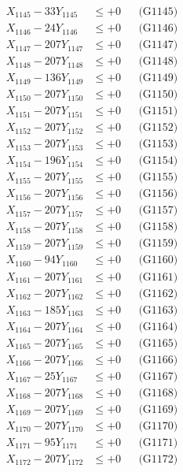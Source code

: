\documentclass[a4paper,10pt]{article}
\begin{document}
{\begin{align}
X_{1145} - 33Y_{1145} &\leq +0 && \text{(G1145)} \\
X_{1146} - 24Y_{1146} &\leq +0 && \text{(G1146)} \\
X_{1147} - 207Y_{1147} &\leq +0 && \text{(G1147)} \\
X_{1148} - 207Y_{1148} &\leq +0 && \text{(G1148)} \\
X_{1149} - 136Y_{1149} &\leq +0 && \text{(G1149)} \\
X_{1150} - 207Y_{1150} &\leq +0 && \text{(G1150)} \\
\allowbreak
X_{1151} - 207Y_{1151} &\leq +0 && \text{(G1151)} \\
X_{1152} - 207Y_{1152} &\leq +0 && \text{(G1152)} \\
X_{1153} - 207Y_{1153} &\leq +0 && \text{(G1153)} \\
X_{1154} - 196Y_{1154} &\leq +0 && \text{(G1154)} \\
X_{1155} - 207Y_{1155} &\leq +0 && \text{(G1155)} \\
X_{1156} - 207Y_{1156} &\leq +0 && \text{(G1156)} \\
X_{1157} - 207Y_{1157} &\leq +0 && \text{(G1157)} \\
X_{1158} - 207Y_{1158} &\leq +0 && \text{(G1158)} \\
X_{1159} - 207Y_{1159} &\leq +0 && \text{(G1159)} \\
X_{1160} - 94Y_{1160} &\leq +0 && \text{(G1160)} \\
\allowbreak
X_{1161} - 207Y_{1161} &\leq +0 && \text{(G1161)} \\
X_{1162} - 207Y_{1162} &\leq +0 && \text{(G1162)} \\
X_{1163} - 185Y_{1163} &\leq +0 && \text{(G1163)} \\
X_{1164} - 207Y_{1164} &\leq +0 && \text{(G1164)} \\
X_{1165} - 207Y_{1165} &\leq +0 && \text{(G1165)} \\
X_{1166} - 207Y_{1166} &\leq +0 && \text{(G1166)} \\
X_{1167} - 25Y_{1167} &\leq +0 && \text{(G1167)} \\
X_{1168} - 207Y_{1168} &\leq +0 && \text{(G1168)} \\
X_{1169} - 207Y_{1169} &\leq +0 && \text{(G1169)} \\
X_{1170} - 207Y_{1170} &\leq +0 && \text{(G1170)} \\
\allowbreak
X_{1171} - 95Y_{1171} &\leq +0 && \text{(G1171)} \\
X_{1172} - 207Y_{1172} &\leq +0 && \text{(G1172)} \\

\end{align}}
\end{document}
